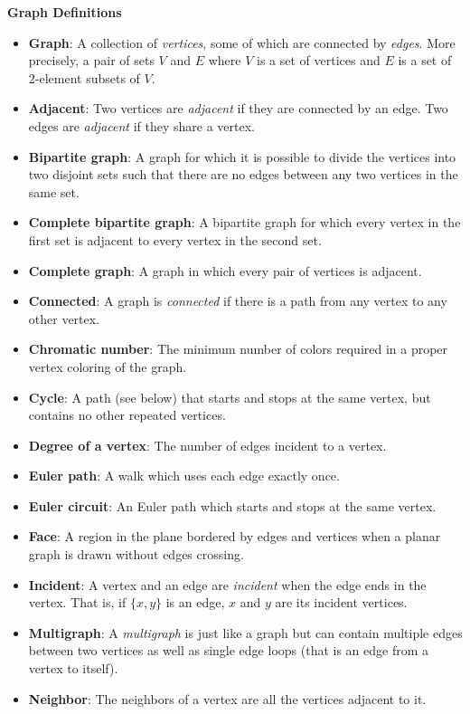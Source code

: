 \documentclass[10pt]{exam}
\begin{document}
\centerline{\bf Graph Definitions}
\begin{itemize}
    \item[] {\bf Graph}: A collection of {\em vertices}, some of which are connected by {\em edges}.  More precisely, a pair of sets $V$ and $E$ where $V$ is a set of vertices and $E$ is a set of 2-element subsets of $V$.
    \item[] {\bf Adjacent}: Two vertices are {\em adjacent} if they are connected by an edge.  Two edges are {\em adjacent} if they share a vertex.
    \item[] {\bf Bipartite graph}: A graph for which it is possible to divide the vertices into two disjoint sets such that there are no edges between any two vertices in the same set.
    \item[] {\bf Complete bipartite graph}: A bipartite graph for which every vertex in the first set is adjacent to every vertex in the second set.
    \item[] {\bf Complete graph}: A graph in which every pair of vertices is adjacent.
    \item[] {\bf Connected}: A graph is {\em connected} if there is a path from any vertex to any other vertex.
    \item[] {\bf Chromatic number}: The minimum number of colors required in a proper vertex coloring of the graph.
    \item[] {\bf Cycle}: A path (see below) that starts and stops at the same vertex, but contains no other repeated vertices.
    \item[] {\bf Degree of a vertex}: The number of edges incident to a vertex.
    \item[] {\bf Euler path}: A walk which uses each edge exactly once.
    \item[] {\bf Euler circuit}: An Euler path which starts and stops at the same vertex.
    \item[] {\bf Face}: A region in the plane bordered by edges and vertices when a planar graph is drawn without edges crossing.
		\item[] {\bf Incident}: A vertex and an edge are \emph{incident} when the edge ends in the vertex.  That is, if $\{x,y\}$ is an edge, $x$ and $y$ are its incident vertices.
    \item[] {\bf Multigraph}: A {\em multigraph} is just like a graph but can contain multiple edges between two vertices as well as single edge loops (that is an edge from a vertex to itself).
    \item[] {\bf Neighbor}: The neighbors of a vertex are all the vertices adjacent to it.

\end{itemize}
\end{document}
